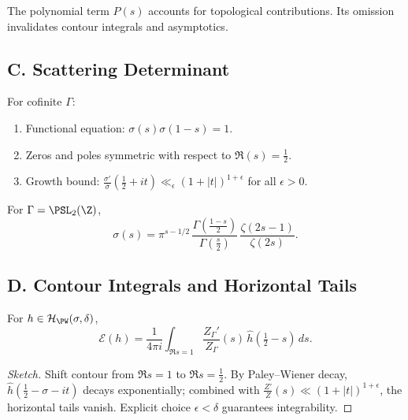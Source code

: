 \begin{remark}
The polynomial term $P(s)$ accounts for topological contributions. Its omission invalidates contour integrals and asymptotics.
\end{remark}

\subsection*{C. Scattering Determinant}
\label{subsec:scattering}

\begin{theorem}
\label{thm:scattering}
For cofinite $\Gamma$:
\begin{enumerate}[label=(\roman*)]
  \item Functional equation: $\sigma(s)\sigma(1-s)=1$.
  \item Zeros and poles symmetric with respect to $\Re(s)=\tfrac12$.
  \item Growth bound: $\frac{\sigma'}{\sigma}(\tfrac12+it)\ll_\epsilon (1+|t|)^{1+\epsilon}$ for all $\epsilon>0$.
\end{enumerate}
\end{theorem}

\begin{example}
For $\Gamma=\PSL_2(\Z)$,
\[
  \sigma(s)=\pi^{s-1/2}\,\frac{\Gamma(\tfrac{1-s}{2})}{\Gamma(\tfrac s2)}\,
  \frac{\zeta(2s-1)}{\zeta(2s)}.
\]
\end{example}

\subsection*{D. Contour Integrals and Horizontal Tails}
\label{subsec:contour}

\begin{theorem}
\label{thm:contour-identity}
For $h\in \mathcal H_{\PW}(\sigma,\delta)$,
\[
  \mathcal E(h) = \frac{1}{4\pi i}\int_{\Re s=1} \frac{Z_\Gamma'}{Z_\Gamma}(s)\,
  \widehat h\!\left(\tfrac12-s\right)\,ds.
\]
\end{theorem}

\begin{proof}[Sketch]
Shift contour from $\Re s=1$ to $\Re s=\tfrac12$. 
By Paley–Wiener decay, $\widehat h(\tfrac12-\sigma-it)$ decays exponentially; combined with $\frac{Z'}{Z}(s)\ll (1+|t|)^{1+\epsilon}$, the horizontal tails vanish. 
Explicit choice $\epsilon<\delta$ guarantees integrability.
\end{proof}

